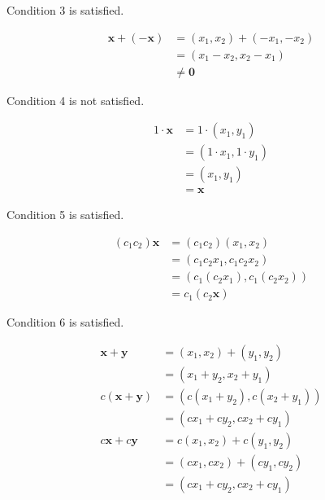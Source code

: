 \documentclass[main.tex]{subfiles}
\begin{document}
\begin{enumerate}
    Condition 3 is satisfied.
    
    $$
    \begin{aligned}
    \mathbf{x}+(-\mathbf{x}) &=\left(x_{1}, x_{2}\right)+\left(-x_{1},-x_{2}\right) \\
    &=\left(x_{1}-x_{2}, x_{2}-x_{1}\right) \\
    & \neq \mathbf{0}
    \end{aligned}
    $$
    
    Condition 4 is not satisfied.

    $$
    \begin{aligned}
    1 \cdot \mathbf{x} &= 1 \cdot\left(x_{1}, y_{1}\right) \\
    &=\left(1 \cdot x_{1}, 1 \cdot y_{1}\right) \\
    &=\left(x_{1}, y_{1}\right) \\
    &=\mathbf{x}
    \end{aligned}
    $$
    
    Condition 5 is satisfied.
    
    $$
    \begin{aligned}
    \left(c_{1} c_{2}\right) \mathbf{x} &=\left(c_{1} c_{2}\right)\left(x_{1}, x_{2}\right) \\
    &=\left(c_{1} c_{2} x_{1}, c_{1} c_{2} x_{2}\right) \\
    &=\left(c_{1}\left(c_{2} x_{1}\right), c_{1}\left(c_{2} x_{2}\right)\right) \\
    &=c_{1}\left(c_{2} \mathbf{x}\right)
    \end{aligned}
    $$
    
    Condition 6 is satisfied.

    $$
    \begin{aligned}
    \mathbf{x}+\mathbf{y} &=\left(x_{1}, x_{2}\right)+\left(y_{1}, y_{2}\right) \\
    &=\left(x_{1}+y_{2}, x_{2}+y_{1}\right) \\
    c(\mathbf{x}+\mathbf{y}) &=\left(c\left(x_{1}+y_{2}\right), c\left(x_{2}+y_{1}\right)\right) \\
    &=\left(c x_{1}+c y_{2}, c x_{2}+c y_{1}\right)\\
    c \mathbf{x}+c \mathbf{y} &=c\left(x_{1}, x_{2}\right)+c\left(y_{1}, y_{2}\right) \\
    &=\left(c x_{1}, c x_{2}\right)+\left(c y_{1}, c y_{2}\right) \\
    &=\left(c x_{1}+c y_{2}, c x_{2}+c y_{1}\right)
    \end{aligned}
    $$
    

\end{enumerate}
\end{document}

